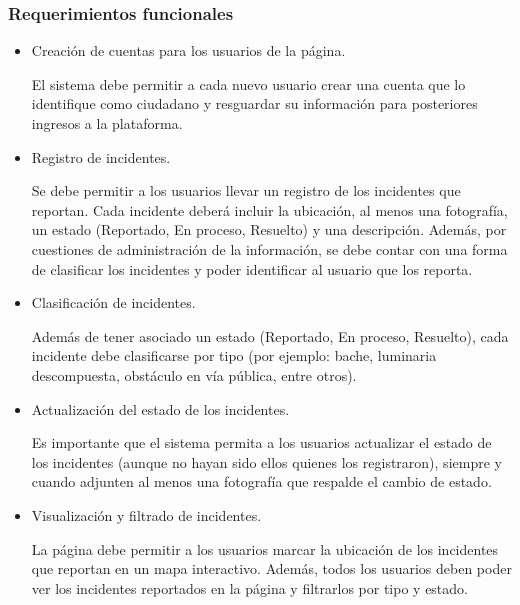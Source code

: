 \subsubsection{Requerimientos funcionales}
\begin{itemize}
    \item Creación de cuentas para los usuarios de la página.
    
    El sistema debe permitir a cada nuevo usuario crear una cuenta que lo identifique como ciudadano y resguardar su información para posteriores ingresos a la plataforma. 
    
    \item Registro de incidentes.
    
    Se debe permitir a los usuarios llevar un registro de los incidentes que reportan. Cada incidente deberá incluir la ubicación, al menos una fotografía, un estado (Reportado, En proceso, Resuelto) y una descripción. Además, por cuestiones de administración de la información, se debe contar con una forma de clasificar los incidentes y poder identificar al usuario que los reporta.
    
    \item Clasificación de incidentes.
    
    Además de tener asociado un estado (Reportado, En proceso, Resuelto), cada incidente debe clasificarse por tipo (por ejemplo: bache, luminaria descompuesta, obstáculo en vía pública, entre otros).
    
    \item Actualización del estado de los incidentes.
    
    Es importante que el sistema permita a los usuarios actualizar el estado de los incidentes (aunque no hayan sido ellos quienes los registraron), siempre y cuando adjunten al menos una fotografía que respalde el cambio de estado.
    
    \item Visualización y filtrado de incidentes.
    
    La página debe permitir a los usuarios marcar la ubicación de los incidentes que reportan en un mapa interactivo. Además, todos los usuarios deben poder ver los incidentes reportados en la página y filtrarlos por tipo y estado.

\end{itemize}

